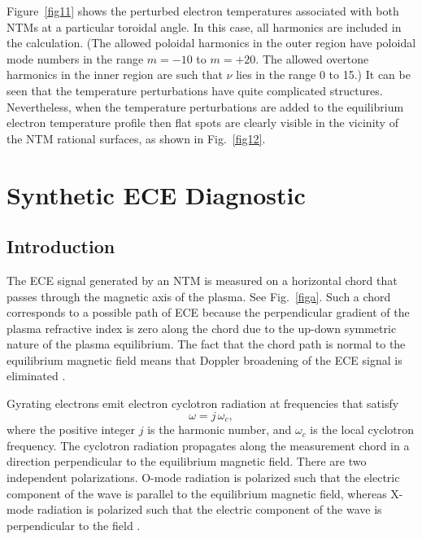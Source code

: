 \documentclass{iopjournal}
\begin{document}
Figure~\ref{fig11} shows
the perturbed electron temperatures associated with both NTMs at a particular toroidal angle. In this case, all harmonics are included in the calculation. (The allowed poloidal harmonics in the
outer region have poloidal mode numbers in the range $m=-10$ to $m=+20$. The allowed overtone harmonics in the inner region are such that
$\nu$ lies in the range $0$ to 15.) It can be seen that the temperature perturbations have quite complicated structures. Nevertheless, when the temperature perturbations are
added to the equilibrium electron temperature profile then flat spots are clearly visible in the vicinity of the NTM rational surfaces, as shown in Fig.~\ref{fig12}. 

\section{Synthetic ECE Diagnostic}\label{s6}
\subsection{Introduction}
The ECE signal generated by an NTM is  measured on a horizontal chord that passes through the magnetic axis of the plasma. See Fig.~\ref{figa}.  Such a chord corresponds to a possible  path of ECE because 
the perpendicular gradient of the plasma refractive index is zero along the chord due to the up-down symmetric nature of the plasma equilibrium. The fact that the
chord path is normal to the equilibrium magnetic field means that Doppler
broadening of the ECE signal is eliminated \cite{ece4a,ece5,bornatici}. 

Gyrating electrons emit electron cyclotron radiation at frequencies that satisfy \cite{bornatici}
\begin{equation}
\omega= j\,\omega_c,
\end{equation}
where the positive integer $j$ is the harmonic number, and $\omega_c$ is the local cyclotron frequency. The cyclotron radiation propagates  along the
measurement chord in a direction perpendicular to the equilibrium magnetic field. There are two independent polarizations. O-mode radiation is
polarized such that the electric component of the wave is parallel to the equilibrium magnetic field, whereas X-mode radiation is polarized such that the
electric component of the wave is perpendicular to the field \cite{plasma}.
\end{document}
